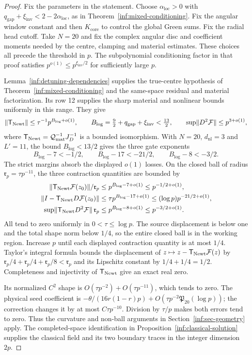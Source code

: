 \begin{proof}
Fix the parameters in the statement. Choose
$\alpha_{\mathrm{loc}}>0$ with
$q_{\mathrm{gap}}+\xi_{\mathrm{inv}}<2-2\alpha_{\mathrm{loc}}$,
as in Theorem~\ref{inf:mixed-conditioning}.
Fix the angular window constant and then $K_{\mathrm{core}}$ to
control the global Green sums. Fix the radial head cutoff.
Take $N=20$ and fix the complex angular disc and coefficient moments
needed by the centre, clamping and material estimates.
These choices all precede the threshold in $p$. The subpolynomial
conditioning factor in that proof satisfies
$p^{o(1)}\le p^{\xi_{\mathrm{inv}}/2}$ for sufficiently large $p$.

Lemma~\ref{inf:detuning-dependencies} supplies the true-centre
hypothesis of Theorem~\ref{inf:mixed-conditioning} and the
same-space residual and material factorization. Its row 12 supplies
the sharp material and nonlinear bounds uniformly in this range.
They give
\[
 \lVert \mathsf T_{\mathrm{Newt}}\rVert\le\tau^{-1}p^{B_{\log}+o(1)},\qquad
 B_{\log}=\tfrac92+q_{\mathrm{gap}}+\xi_{\mathrm{inv}}<\tfrac{13}2,
 \qquad \sup\lVert D^2\mathcal F\rVert\le p^{3+o(1)},
\]
where $\mathsf T_{\mathrm{Newt}}=\mathcal Q_{\mathrm{mat}}^{-1}J_D^{-1}$ is a bounded isomorphism.
With $N=20$, $d_{\mathrm{nl}}=3$ and $L'=11$, the bound
$B_{\log}<13/2$ gives the three gate exponents
\[
 B_{\log}-7<-1/2,\qquad B_{\log}-17<-21/2,\qquad
 B_{\log}-8<-3/2.
\]
The strict margins absorb the displayed $o(1)$ losses.
On the closed ball of radius $\mathfrak r_p=\tau p^{-11}$,
the three contraction quantities are bounded by
\begin{align}
 \lVert \mathsf T_{\mathrm{Newt}}\mathcal F(z_0)\rVert/\mathfrak r_p
 &\le p^{B_{\log}-7+o(1)}\le p^{-1/2+o(1)},
 \label{inf:log-gate-one}\\
 \lVert I-\mathsf T_{\mathrm{Newt}} D\mathcal F(z_0)\rVert
 &\le\tau p^{B_{\log}-17+o(1)}
       \le(\log p)p^{-21/2+o(1)},\label{inf:log-gate-two}\\
 \sup\lVert \mathsf T_{\mathrm{Newt}} D^2\mathcal F\rVert\,\mathfrak r_p
 &\le p^{B_{\log}-8+o(1)}\le p^{-3/2+o(1)}.
 \label{inf:log-gate-three}
\end{align}
All tend to zero uniformly in $0<\tau\le\log p$.
The source displacement is below one and the total shape norm
below $1/4$, so the entire closed ball is in the working region.
Increase $p$ until each displayed contraction quantity is at most
$1/4$. Taylor's integral formula bounds the displacement of
$z\mapsto z-\mathsf T_{\mathrm{Newt}}\mathcal F(z)$ by
$\mathfrak r_p/4+\mathfrak r_p/4+\mathfrak r_p/8<\mathfrak r_p$
and its Lipschitz constant by $1/4+1/4=1/2$.
Completeness and injectivity of $\mathsf T_{\mathrm{Newt}}$ give an exact real zero.

Its normalized $C^2$ shape is $O(\tau p^{-2})+O(\tau p^{-11})$,
which tends to zero. The physical seed coefficient is
$-\theta/(16r(1-r)p)+O(\tau p^{-2}\mathfrak P_{20}(\log p))$;
the correction changes it by at most $C\tau p^{-10}$.
Division by $\tau/p$ makes both errors tend to zero.
Thus the curvature and non-ball arguments in
Section~\ref{inf:sec-geometry} apply. The completed-space
identification in Proposition~\ref{inf:classical-solution} supplies
the classical field and its two boundary traces in the integer
dimension $2p$.
\end{proof}

